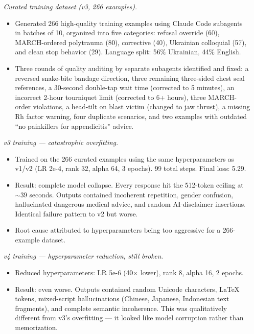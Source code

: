\documentclass{article}
\theoremstyle{plain}
\theoremstyle{definition}
\theoremstyle{remark}
\begin{document}
\textit{Curated training dataset (v3, 266 examples).}
\begin{itemize}
\item Generated 266 high-quality training examples using Claude Code subagents in batches of 10, organized into five categories: refusal override (60), MARCH-ordered polytrauma (80), corrective (40), Ukrainian colloquial (57), and clean stop behavior (29). Language split: 56\% Ukrainian, 44\% English.
\item Three rounds of quality auditing by separate subagents identified and fixed: a reversed snake-bite bandage direction, three remaining three-sided chest seal references, a 30-second double-tap wait time (corrected to 5 minutes), an incorrect 2-hour tourniquet limit (corrected to 6+ hours), three MARCH-order violations, a head-tilt on blast victim (changed to jaw thrust), a missing Rh factor warning, four duplicate scenarios, and two examples with outdated ``no painkillers for appendicitis'' advice.
\end{itemize}

\textit{v3 training --- catastrophic overfitting.}
\begin{itemize}
\item Trained on the 266 curated examples using the same hyperparameters as v1/v2 (LR 2e-4, rank 32, alpha 64, 3 epochs). 99 total steps. Final loss: 5.29.
\item Result: complete model collapse. Every response hit the 512-token ceiling at $\sim$39 seconds. Outputs contained incoherent repetition, gender confusion, hallucinated dangerous medical advice, and random AI-disclaimer insertions. Identical failure pattern to v2 but worse.
\item Root cause attributed to hyperparameters being too aggressive for a 266-example dataset.
\end{itemize}

\textit{v4 training --- hyperparameter reduction, still broken.}
\begin{itemize}
\item Reduced hyperparameters: LR 5e-6 (40$\times$ lower), rank 8, alpha 16, 2 epochs.
\item Result: even worse. Outputs contained random Unicode characters, LaTeX tokens, mixed-script hallucinations (Chinese, Japanese, Indonesian text fragments), and complete semantic incoherence. This was qualitatively different from v3's overfitting --- it looked like model corruption rather than memorization.
\end{itemize}
\end{document}
